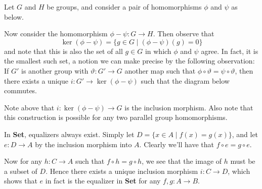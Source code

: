     \begin{example}
        Let $G$ and $H$ be groups, and consider a pair of homomorphisms
        $\phi$ and $\psi$ as below.
        \begin{center}
        \end{center}
        Now consider the homomorphism $\phi - \psi:G \to H$. 
        Then observe that 
        \[
            \ker(\phi - \psi) = \bigg\{ g \in G \;\bigg|\; (\phi - \psi)(g) = 0   \bigg\}
        \]
        and note that this is also the set of all $g \in G$ in which $\phi$ and $\psi$ agree.
        In fact, it is the smallest such set, a notion we can make precise 
        by the following observation: If $G'$ is another group with 
        $\vartheta: G' \to G$ another map such that $\phi \circ \vartheta = \psi \circ \vartheta$, 
        then there exists a unique $i: G' \to \ker(\phi - \psi)$ 
        such that the diagram below commutes.  
        \begin{center}
        \end{center}
        Note above that $i: \ker(\phi - \psi) \to G$ is the inclusion morphism. 
        Also note that this construction is possible for any two parallel 
        group homomorphisms. 
    \end{example}

    \begin{example}
        In \textbf{Set}, equalizers always exist. Simply
        let $D = \{x \in A \mid f(x) = g(x)\}$, and let $e: D
        \to A$ by the inclusion morphism into $A$. Clearly we'll have that
        $f \circ e = g \circ e$. 
    
        Now for any $h: C \to A$ such that $f \circ h = g \circ h$, we see
        that the image of $h$ must be a subset of $D$. Hence there exists
        a unique inclusion morphism $i: C \to D$, which shows that $e$ in
        fact is the equalizer in \textbf{Set} for any $f, g: A \to B$.         
        \end{example}
    


